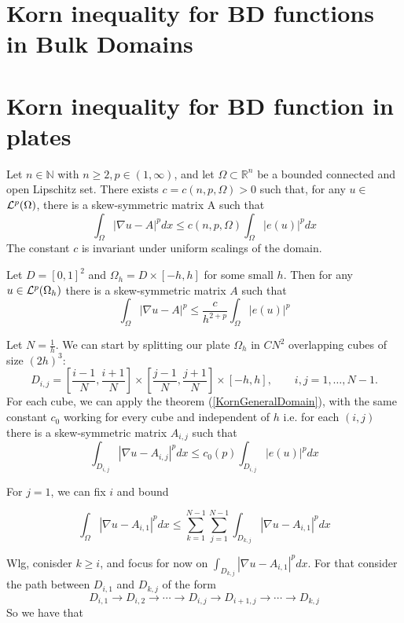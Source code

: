 \section{Korn inequality for BD functions in  Bulk Domains}
\section{Korn inequality for BD function in plates}

\begin{theorem}\label{KornGeneralDomain}
    Let $n \in \mathbb{N}$ with $n \geq 2, p \in(1, \infty)$, and let $\Omega \subset \mathbb{R}^n$ be a bounded  connected and open Lipschitz set. There exists $c=c(n, p, \Omega)>0$ such that, for any $u \in$ ${\mathcal L}^p(\Omega)$, there is a skew-symmetric matrix A such that
    $$
    \int_{\Omega}|\nabla u-A|^p d x \leq c(n, p, \Omega) \int_{\Omega}|e(u)|^p d x
    $$
    The constant $c$ is invariant under uniform scalings of the domain.
    \end{theorem}
    
    \begin{theorem} Let $D=[0,1]^2$ and $\Omega_h = D\times[-h,h]$ for some small $h$. Then for any $u\in {\mathcal L}^p(\Omega_h)$ there is  a skew-symmetric matrix $A$ such that
    $$\int_{\Omega} |\nabla u - A|^p\leq \frac{c}{h^{2+p}}\int_{\Omega}|e(u)|^p$$
    \end{theorem}
    Let $N=\frac{1}{h}$. We can start by splitting our plate $\Omega_h$ in $CN^2$ overlapping cubes of size $(2h)^3$:
    $$D_{i,j}=[\frac{i-1}{N},\frac{i+1}{N}]\times[\frac{j-1}{N},\frac{j+1}{N}]\times[-h,h],\qquad i,j=1,\ldots,N-1.$$
    For each cube, we can apply the theorem (\ref{KornGeneralDomain}), with the same constant $c_0$ working for every cube and independent of $h$ i.e. for each $(i,j)$ there is a skew-symmetric matrix $A_{i,j}$ such that 
    \begin{equation}%
    \int_{D_{i,j} }|\nabla u- A_{i,j}|^p d x \leq c_0(p) \int_{D_{i,j}}|e(u)|^p d x
    \end{equation}
    
    For $j=1$, we can fix $i$ and bound
    
    \begin{equation}
    \int_{\Omega }|\nabla u- A_{i,1}|^p d x \leq \sum_{k=1}^{N-1}\sum_{j=1}^{N-1}\int_{D_{k,j}}|\nabla u- A_{i,1}|^p d x
    \end{equation}
    
    Wlg, conisder $k\geq i$, and focus for now on  $\int_{D_{k,j}}|\nabla u- A_{i,1}|^p d x$. For that consider the path between $D_{i,1}$ and $D_{k,j}$ of the form
    $$D_{i,1}\to D_{i,2}\to\cdots\to D_{i,j}\to D_{i+1,j}\to\cdots\to D_{k,j}$$
    So we have that
    
